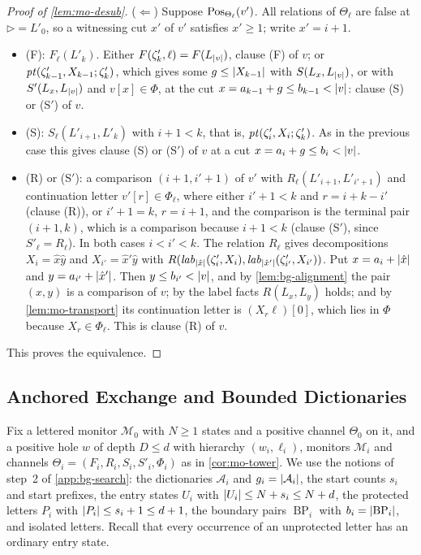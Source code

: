 \begin{proof}[Proof of \cref{lem:mo-desub}]
($\Leftarrow$) Suppose $\operatorname{Pos}_{\Theta_\ell}(v')$. All relations of $\Theta_\ell$
are false at $\triangleright=L'_0$, so a witnessing cut $x'$ of $v'$ satisfies
$x'\ge1$; write $x'=i+1$.
\begin{itemize}[leftmargin=*]
\item (F): $F_\ell(L'_k)$. Either $F(\zeta'_k,\ell)=F(L_{\lvert v\rvert})$, clause (F)
  of $v$; or $\mathit{pt}(\zeta'_{k-1},X_{k-1};\zeta'_k)$, which gives some
  $g\le\lvert X_{k-1}\rvert$ with $S(L_x,L_{\lvert v\rvert})$, or with $S'(L_x,L_{\lvert v\rvert})$ and
  $v[x]\in\Phi$, at the cut $x=a_{k-1}+g\le b_{k-1}<\lvert v\rvert$: clause (S) or
  (S$'$) of $v$.
\item (S): $S_\ell(L'_{i+1},L'_k)$ with $i+1<k$, that is,
  $\mathit{pt}(\zeta'_i,X_i;\zeta'_k)$. As in the previous case this gives clause (S)
  or (S$'$) of $v$ at a cut $x=a_i+g\le b_i<\lvert v\rvert$.
\item (R) or (S$'$): a comparison $(i+1,i'+1)$ of $v'$ with
  $R_\ell(L'_{i+1},L'_{i'+1})$ and continuation letter $v'[r]\in\Phi_\ell$,
  where either $i'+1<k$ and $r=i+k-i'$ (clause (R)), or $i'+1=k$, $r=i+1$, and
  the comparison is the terminal pair $(i+1,k)$, which is a comparison because
  $i+1<k$ (clause (S$'$), since $S'_\ell=R_\ell$). In both cases $i<i'<k$.
  The relation $R_\ell$ gives decompositions $X_i=\hat x\hat y$ and
  $X_{i'}=\hat x'\hat y$ with
  $R(\mathit{lab}_{\lvert \hat x\rvert}(\zeta'_i,X_i),\mathit{lab}_{\lvert \hat x'\rvert}(\zeta'_{i'},X_{i'}))$.
  Put $x=a_i+\lvert \hat x\rvert$ and $y=a_{i'}+\lvert \hat x'\rvert$. Then $y\le b_{i'}<\lvert v\rvert$, and by \cref{lem:bg-alignment} the pair $(x,y)$ is a comparison of $v$; by
  the label facts $R(L_x,L_y)$ holds; and by \cref{lem:mo-transport} its
  continuation letter is $(X_r\ell)[0]$, which lies in $\Phi$ because
  $X_r\in\Phi_\ell$. This is clause (R) of $v$.
\end{itemize}
This proves the equivalence.
\end{proof}

\subsection{Anchored Exchange and Bounded Dictionaries}\label{app:mo-exchange}

Fix a lettered monitor $\mathcal M_0$ with $N\ge1$ states and a positive
channel $\Theta_0$ on it, and a positive hole $w$ of depth $D\le d$ with
hierarchy $(w_i,\ell_i)$, monitors $\mathcal M_i$ and channels
$\Theta_i=(F_i,R_i,S_i,S'_i,\Phi_i)$ as in \cref{cor:mo-tower}. We use the
notions of step~2 of \cref{app:bg-search}: the dictionaries $\mathcal A_i$ and
$g_i=\lvert \mathcal A_i\rvert$, the start counts $s_i$ and start prefixes, the entry
states $U_i$ with $\lvert U_i\rvert\le N+s_i\le N+d$, the protected letters $P_i$ with
$\lvert P_i\rvert\le s_i+1\le d+1$, the boundary pairs $\operatorname{BP}_i$ with
$b_i=\lvert \operatorname{BP}_i\rvert$, and isolated letters. Recall that every
occurrence of an unprotected letter has an ordinary entry state.

